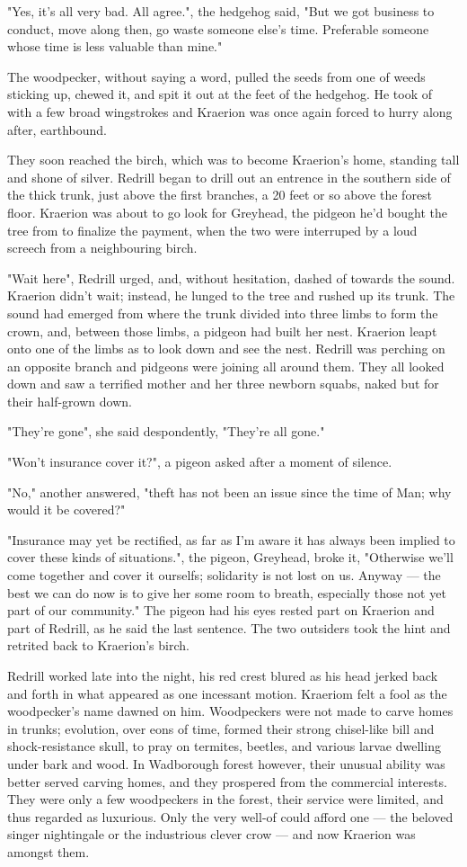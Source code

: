 "Yes, it's all very bad. All agree.", the hedgehog said, "But we got business to conduct, move along then, go waste someone else's time. Preferable someone whose time is less valuable than mine."

The woodpecker, without saying a word, pulled the seeds from one of weeds sticking up, chewed it, and spit it out at the feet of the hedgehog. He took of with a few broad wingstrokes and Kraerion was once again forced to hurry along after, earthbound.

They soon reached the birch, which was to become Kraerion's home, standing tall and shone of silver. Redrill began to drill out an entrence in the southern side of the thick trunk, just above the first branches, a 20 feet or so above the forest floor. Kraerion was about to go look for Greyhead, the pidgeon he'd bought the tree from to finalize the payment, when the two were interruped by a loud screech from a neighbouring birch.

"Wait here", Redrill urged, and, without hesitation, dashed of towards the sound. Kraerion didn't wait; instead, he lunged to the tree and rushed up its trunk. The sound had emerged from where the trunk divided into three limbs to form the crown, and, between those limbs, a pidgeon had built her nest. Kraerion leapt onto one of the limbs as to look down and see the nest. Redrill was perching on an opposite branch and pidgeons were joining all around them. They all looked down and saw a terrified mother and her three newborn squabs, naked but for their half-grown down.

"They're gone", she said despondently, "They're all gone."

"Won't insurance cover it?", a pigeon asked after a moment of silence.

"No," another answered, "theft has not been an issue since the time of Man; why would it be covered?"

"Insurance may yet be rectified, as far as I'm aware it has always been implied to cover these kinds of situations.", the pigeon, Greyhead, broke it, "Otherwise we'll come together and cover it ourselfs; solidarity is not lost on us. Anyway — the best we can do now is to give her some room to breath, especially those not yet part of our community." The pigeon had his eyes rested part on Kraerion and part of Redrill, as he said the last sentence. The two outsiders took the hint and retrited back to Kraerion's birch.

Redrill worked late into the night, his red crest blured as his head jerked back and forth in what appeared as one incessant motion. Kraeriom felt a fool as the woodpecker's name dawned on him.
Woodpeckers were not made to carve homes in trunks; evolution, over eons of time, formed their strong chisel-like bill and shock-resistance skull, to pray on termites, beetles, and various larvae dwelling under bark and wood. In Wadborough forest however, their unusual ability was better served carving homes, and they prospered from the commercial interests. They were only a few woodpeckers in the forest, their service were limited, and thus regarded as luxurious. Only the very well-of could afford one — the beloved singer nightingale or the industrious clever crow — and now Kraerion was amongst them.

